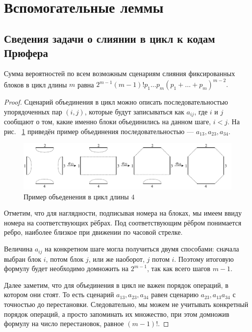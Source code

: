 \section{Вспомогательные леммы}
\subsection{Сведения задачи о слиянии в цикл к кодам Прюфера}
\begin{lemma}
Сумма вероятностей по всем возможным сценариям слияния фиксированных блоков в цикл длины $m$ равна $2 ^ {m - 1} (m - 1)! p_1 \ldots p_m (p_1 + \ldots + p_m) ^ {m - 2}.$
\label{l-prufer}
\end{lemma}
\begin{proof}

Сценарий объединения в цикл можно описать последовательностью упорядоченных пар $(i, j)$, которые будут записываться как $a_{ij}$, где $i$ и $j$ сообщают о том, какие именно блоки объединились на данном шаге, $i < j$.
На рис. ~\ref{merge-into-cycle} приведён пример объединения последовательностью --- $a_{13}, a_{23}, a_{34}$.
\begin{figure}[h!]
    \includegraphics[width=\linewidth]{img/merge-into-cycle.pdf}
    \caption{Пример объеденения в цикл длины $4$}
    \label{merge-into-cycle}
\end{figure}

Отметим, что для наглядности, подписывая номера на блоках, мы имеем ввиду номера на соответствующих рёбрах.
Под соответствующим рёбром понимается ребро, наиболее близкое при движении по часовой стрелке.

Величина $a_{ij}$ на конкретном шаге могла получиться двумя способами: сначала выбран блок $i$, потом блок $j$, или же наоборот, $j$ потом $i$. Поэтому итоговую формулу будет необходимо домножить на $2^{m-1}$, так как всего шагов $m-1$.

Далее заметим, что для объединения в цикл не важен порядок операций, в котором они стоят. То есть сценарий $a_{13}, a_{23}, a_{34}$ равен сценарию $a_{23}, a_{13} a_{34}$ с точностью до перестановки. Следовательно, мы можем не учитывать конкретный порядок операций, а просто запоминать их множество, при этом домножив формулу на число перестановок, равное $(m-1)!$.


\end{proof}
